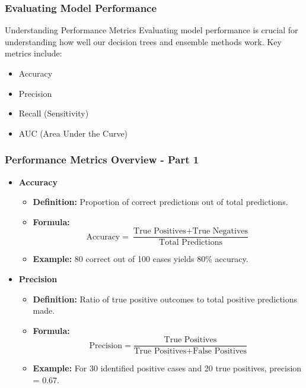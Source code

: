 \documentclass[aspectratio=169]{beamer}
\begin{document}
\begin{frame}[fragile]
    \frametitle{Evaluating Model Performance}
    \begin{block}{Understanding Performance Metrics}
        Evaluating model performance is crucial for understanding how well our decision trees and ensemble methods work. Key metrics include:
        \begin{itemize}
            \item Accuracy
            \item Precision
            \item Recall (Sensitivity)
            \item AUC (Area Under the Curve)
        \end{itemize}
    \end{block}
\end{frame}

\begin{frame}[fragile]
    \frametitle{Performance Metrics Overview - Part 1}
    \begin{itemize}
        \item \textbf{Accuracy}
        \begin{itemize}
            \item \textbf{Definition:} Proportion of correct predictions out of total predictions.
            \item \textbf{Formula:} 
            \begin{equation}
            \text{Accuracy} = \frac{\text{True Positives} + \text{True Negatives}}{\text{Total Predictions}}
            \end{equation}
            \item \textbf{Example:} 80 correct out of 100 cases yields 80\% accuracy.
        \end{itemize}
        
        \item \textbf{Precision}
        \begin{itemize}
            \item \textbf{Definition:} Ratio of true positive outcomes to total positive predictions made.
            \item \textbf{Formula:} 
            \begin{equation}
            \text{Precision} = \frac{\text{True Positives}}{\text{True Positives} + \text{False Positives}}
            \end{equation}
            \item \textbf{Example:} For 30 identified positive cases and 20 true positives, precision = 0.67.
        \end{itemize}
    \end{itemize}
\end{frame}
\end{document}
